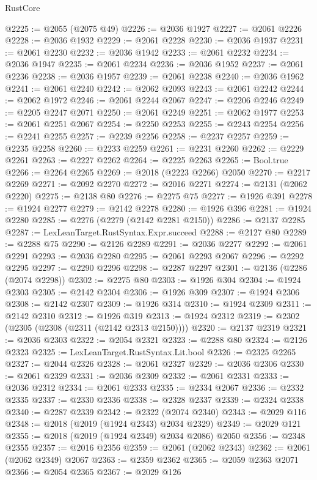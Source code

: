 \begin{lexlean}{RustCore}
\begin{coremodule}
@2225 := @2055 (@2075 @49)
@2226 := @2036 @1927
@2227 := @2061 @2226
@2228 := @2036 @1932
@2229 := @2061 @2228
@2230 := @2036 @1937
@2231 := @2061 @2230
@2232 := @2036 @1942
@2233 := @2061 @2232
@2234 := @2036 @1947
@2235 := @2061 @2234
@2236 := @2036 @1952
@2237 := @2061 @2236
@2238 := @2036 @1957
@2239 := @2061 @2238
@2240 := @2036 @1962
@2241 := @2061 @2240
@2242 := @2062 @2093
@2243 := @2061 @2242
@2244 := @2062 @1972
@2246 := @2061 @2244 @2067
@2247 := @2206 @2246
@2249 := @2205 @2247 @2071
@2250 := @2061 @2249
@2251 := @2062 @1977
@2253 := @2061 @2251 @2067
@2254 := @2250 @2253
@2255 := @2243 @2254
@2256 := @2241 @2255
@2257 := @2239 @2256
@2258 := @2237 @2257
@2259 := @2235 @2258
@2260 := @2233 @2259
@2261 := @2231 @2260
@2262 := @2229 @2261
@2263 := @2227 @2262
@2264 := @2225 @2263
@2265 := Bool.true
@2266 := @2264 @2265
@2269 := @2018 (@2223 @2266) @2050
@2270 := @2217 @2269
@2271 := @2092 @2270
@2272 := @2016 @2271
@2274 := @2131 (@2062 @2220)
@2275 := @2138 @80
@2276 := @2275 @75
@2277 := @1926 @391
@2278 := @1924 @2277
@2279 := @2142 @2278
@2280 := @1926 @396
@2281 := @1924 @2280
@2285 := @2276 (@2279 (@2142 @2281 @2150))
@2286 := @2137 @2285
@2287 := LexLeanTarget.RustSyntax.Expr.succeed
@2288 := @2127 @80
@2289 := @2288 @75
@2290 := @2126 @2289
@2291 := @2036 @2277
@2292 := @2061 @2291
@2293 := @2036 @2280
@2295 := @2061 @2293 @2067
@2296 := @2292 @2295
@2297 := @2290 @2296
@2298 := @2287 @2297
@2301 := @2136 (@2286 (@2074 @2298))
@2302 := @2275 @80
@2303 := @1926 @304
@2304 := @1924 @2303
@2305 := @2142 @2304
@2306 := @1926 @309
@2307 := @1924 @2306
@2308 := @2142 @2307
@2309 := @1926 @314
@2310 := @1924 @2309
@2311 := @2142 @2310
@2312 := @1926 @319
@2313 := @1924 @2312
@2319 := @2302 (@2305 (@2308 (@2311 (@2142 @2313 @2150))))
@2320 := @2137 @2319
@2321 := @2036 @2303
@2322 := @2054 @2321
@2323 := @2288 @80
@2324 := @2126 @2323
@2325 := LexLeanTarget.RustSyntax.Lit.bool
@2326 := @2325 @2265
@2327 := @2044 @2326
@2328 := @2061 @2327
@2329 := @2036 @2306
@2330 := @2061 @2329
@2331 := @2036 @2309
@2332 := @2061 @2331
@2333 := @2036 @2312
@2334 := @2061 @2333
@2335 := @2334 @2067
@2336 := @2332 @2335
@2337 := @2330 @2336
@2338 := @2328 @2337
@2339 := @2324 @2338
@2340 := @2287 @2339
@2342 := @2322 (@2074 @2340)
@2343 := @2029 @116
@2348 := @2018 (@2019 (@1924 @2343) @2034 @2329)
@2349 := @2029 @121
@2355 := @2018 (@2019 (@1924 @2349) @2034 @2086) @2050
@2356 := @2348 @2355
@2357 := @2016 @2356
@2359 := @2061 (@2062 @2343)
@2362 := @2061 (@2062 @2349) @2067
@2363 := @2359 @2362
@2365 := @2059 @2363 @2071
@2366 := @2054 @2365
@2367 := @2029 @126

\end{coremodule}
\end{lexlean}
